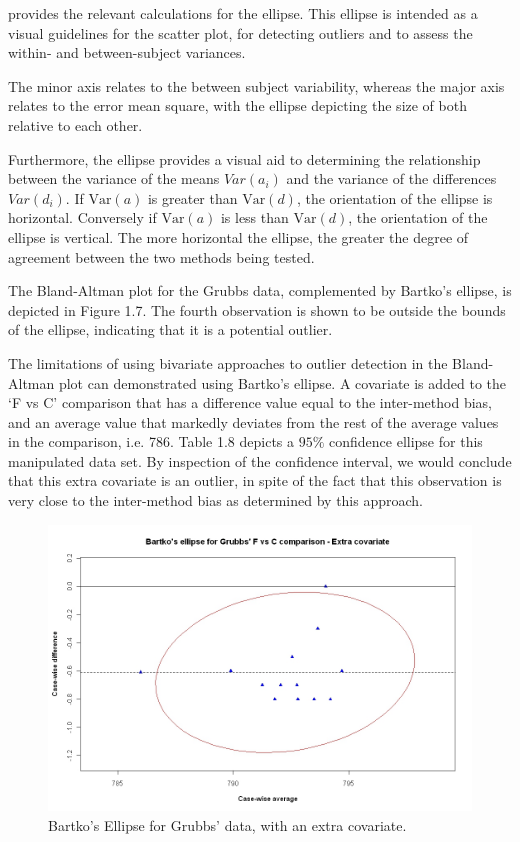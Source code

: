 \documentclass[12pt, a4paper]{report}
\theoremstyle{plain}
\theoremstyle{definition}
\theoremstyle{remark}
\begin{document}
\citet{AltmanEllipse} provides the relevant calculations for the ellipse. This ellipse is intended as a visual
guidelines for the scatter plot, for detecting outliers and to
assess the within- and between-subject variances.

The minor axis relates to the between subject variability, whereas
the major axis relates to the error mean square, with the ellipse
depicting the size of both relative to each other.



Furthermore, the ellipse provides a visual aid to determining the relationship between the variance of the means $Var(a_{i})$ and the variance of the differences $Var(d_{i})$. If $\mbox{Var}(a)$ is greater than $\mbox{Var}(d)$, the orientation of the ellipse is horizontal. Conversely if $\mbox{Var}(a)$ is less than $\mbox{Var}(d)$, the orientation of the ellipse is vertical. The more horizontal the ellipse, the greater the degree of agreement between the two methods being tested.



The Bland-Altman plot for the Grubbs data, complemented by Bartko's ellipse, is depicted in Figure 1.7.
The fourth observation is shown to be outside the bounds of the ellipse, indicating that it is a potential outlier.

The limitations of using bivariate approaches to outlier detection
in the Bland-Altman plot can demonstrated using Bartko's ellipse.
A covariate is added to the `F vs C' comparison that has a
difference value equal to the inter-method bias, and an average
value that markedly deviates from the rest of the average values
in the comparison, i.e. 786. Table 1.8 depicts a $95\%$ confidence
ellipse for this manipulated data set. By inspection of the
confidence interval, we would conclude that this extra
covariate is an outlier, in spite of the fact that this
observation is very close to the inter-method bias as determined by this approach.

\begin{figure}[h!]
	\includegraphics[width=130mm]{images/GrubbsBartko2.jpeg}
	\caption{Bartko's Ellipse for Grubbs' data, with an extra covariate.}\label{GrubbsBartko2}
\end{figure}
\end{document}
